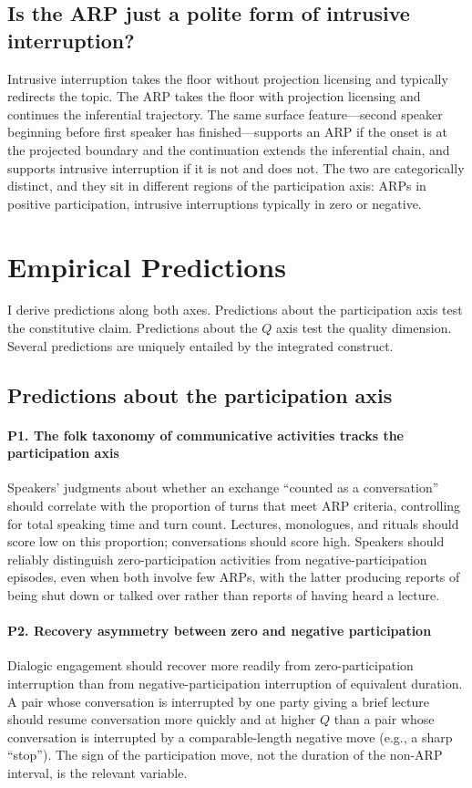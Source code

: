 \subsection{Is the ARP just a polite form of intrusive interruption?}

Intrusive interruption takes the floor without projection licensing and typically redirects the topic. The ARP takes the floor with projection licensing and continues the inferential trajectory. The same surface feature---second speaker beginning before first speaker has finished---supports an ARP if the onset is at the projected boundary and the continuation extends the inferential chain, and supports intrusive interruption if it is not and does not. The two are categorically distinct, and they sit in different regions of the participation axis: ARPs in positive participation, intrusive interruptions typically in zero or negative.

\section{Empirical Predictions}\label{sec:predictions}

I derive predictions along both axes. Predictions about the participation axis test the constitutive claim. Predictions about the $Q$ axis test the quality dimension. Several predictions are uniquely entailed by the integrated construct.

\subsection{Predictions about the participation axis}

\paragraph{P1. The folk taxonomy of communicative activities tracks the participation axis} Speakers' judgments about whether an exchange ``counted as a conversation'' should correlate with the proportion of turns that meet ARP criteria, controlling for total speaking time and turn count. Lectures, monologues, and rituals should score low on this proportion; conversations should score high. Speakers should reliably distinguish zero-participation activities from negative-participation episodes, even when both involve few ARPs, with the latter producing reports of being shut down or talked over rather than reports of having heard a lecture.

\paragraph{P2. Recovery asymmetry between zero and negative participation} Dialogic engagement should recover more readily from zero-participation interruption than from negative-participation interruption of equivalent duration. A pair whose conversation is interrupted by one party giving a brief lecture should resume conversation more quickly and at higher $Q$ than a pair whose conversation is interrupted by a comparable-length negative move (e.g., a sharp ``stop''). The sign of the participation move, not the duration of the non-ARP interval, is the relevant variable.

